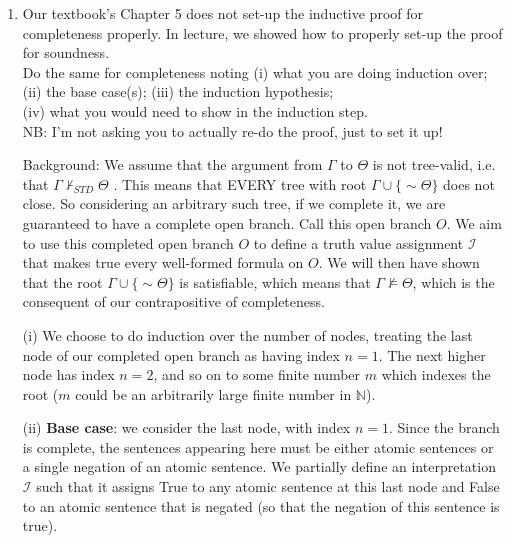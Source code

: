 \documentclass[12pt]{article}
\def\enot{\ensuremath{{\sim}}} %
\let\oldsim\sim %
\renewcommand{\sim}{{\oldsim}} %
\newcommand*{\metav}[1]{\ensuremath{\mathcal{#1}}}
\def\nentails{\ensuremath{\nvDash}}
\begin{document}
\begin{enumerate}
\newpage

\item Our textbook's Chapter 5 does not set-up the inductive proof for completeness properly. In lecture, we showed how to properly set-up the proof for soundness. \\ Do the same for completeness noting (i) what you are doing induction over; \\ (ii) the base case(s); (iii) the induction hypothesis; \\ (iv) what you would need to show in the induction step. \\ NB: I'm not asking you to actually re-do the proof, just to set it up! 


Background: We assume that the argument from $\Gamma$ to $\Theta$ is not tree-valid, i.e. that $\Gamma \nvdash_{STD} \Theta$ . This means that EVERY tree with root $\Gamma \cup\{ \enot \Theta\} $ does not close. So considering an arbitrary such tree, if we complete it, we are guaranteed to have a complete open branch. Call this open branch $O $. We aim to use this completed open branch $O$ to define a truth value assignment \metav{I} that makes true every well-formed formula on $O $. We will then have shown that the root $\Gamma \cup\{ \enot \Theta\} $ is satisfiable, which means that $\Gamma \nentails \Theta$, which is the consequent of our contrapositive of completeness. 


(i) We choose to do induction over the number of nodes, treating the last node of our completed open branch as having index $n=1$. The next higher node has index $n=2$, and so on to some finite number $m$ which indexes the root ($m$ could be an arbitrarily large finite number in $\mathbb{N}$).

(ii) \textbf{Base case}: we consider the last node, with index $n=1$. Since the branch is complete, the sentences appearing here must be either atomic sentences or a single negation of an atomic sentence. We partially define an interpretation \metav{I} such that it assigns True to any atomic sentence at this last node and False to an atomic sentence that is negated (so that the negation of this sentence is true).  


\end{enumerate}
\end{document}
